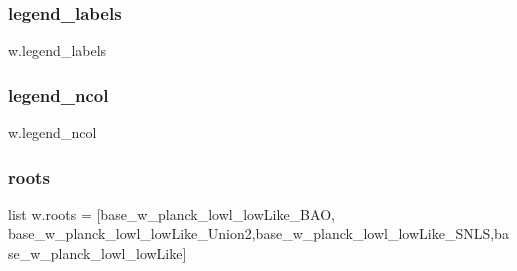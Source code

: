 \mbox{\label{namespacew_ac0108ae140a4e9b8b5d27b0d05b1f45f}} 
\subsubsection{\texorpdfstring{legend\+\_\+labels}{legend\_labels}}
{\footnotesize\ttfamily w.\+legend\+\_\+labels}

\mbox{\label{namespacew_ad5906fcb9311c42ac28b9312463bc81e}} 
\subsubsection{\texorpdfstring{legend\+\_\+ncol}{legend\_ncol}}
{\footnotesize\ttfamily w.\+legend\+\_\+ncol}

\mbox{\label{namespacew_a38d82b401a917a998a088fb727320940}} 
\subsubsection{\texorpdfstring{roots}{roots}}
{\footnotesize\ttfamily list w.\+roots = \mbox{[}\textquotesingle{}base\+\_\+w\+\_\+planck\+\_\+lowl\+\_\+low\+Like\+\_\+\+B\+AO\textquotesingle{}, \textquotesingle{}base\+\_\+w\+\_\+planck\+\_\+lowl\+\_\+low\+Like\+\_\+\+Union2\textquotesingle{},\textquotesingle{}base\+\_\+w\+\_\+planck\+\_\+lowl\+\_\+low\+Like\+\_\+\+S\+N\+LS\textquotesingle{},\textquotesingle{}base\+\_\+w\+\_\+planck\+\_\+lowl\+\_\+low\+Like\textquotesingle{}\mbox{]}}

